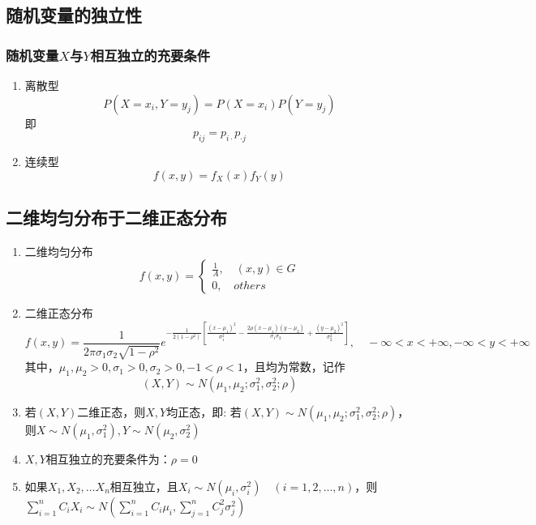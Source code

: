 \subsection{随机变量的独立性}
\subsubsection{随机变量$X$与$Y$相互独立的充要条件}
\begin{enumerate}
	\item 离散型
	\begin{equation}
		P(X=x_i, Y=y_j) = P(X=x_i)P(Y=y_j)
	\end{equation}
	即
	\begin{equation}
		p_{ij} = p_{i\cdot} p_{\cdot j}
	\end{equation}

	\item 连续型
	\begin{equation}
		f(x, y) = f_X(x)f_Y(y)
	\end{equation}
	
\end{enumerate}


\subsection{二维均匀分布于二维正态分布}
\begin{enumerate}
	\item 二维均匀分布
		\[ f(x, y)=\begin{cases}
			\frac{1}{A}, \quad (x, y) \in G \\
			0, \quad others
		\end{cases} \]

	\item 二维正态分布
	\begin{equation}
		f(x,y) = \frac{1}{2\pi \sigma_1 \sigma_2 \sqrt{1-\rho^2}}e^{-\frac{1}{2(1-\rho^2)}\left[ \frac{(x-\mu_1)^2}{\sigma_1^2} - \frac{2\rho(x-\mu_1)(y-\mu_2)}{\sigma_1 \sigma_2} + \frac{(y-\mu_2)^2}{\sigma_2^2} \right]}, \quad -\infty<x<+\infty, -\infty<y<+\infty
	\end{equation}
	其中，$\mu_1, \mu_2 > 0, \sigma_1>0, \sigma_2 > 0, -1<\rho < 1$，且均为常数，记作
	\begin{equation}
		(X,Y) \sim N(\mu_1, \mu_2; \sigma_1^2, \sigma_2^2; \rho)
	\end{equation}

	\item 若$(X,Y)$二维正态，则$X, Y$均正态，即: 若$(X, Y) \sim N(\mu_1, \mu_2; \sigma_1^2, \sigma_2^2; \rho)$，则$X \sim N(\mu_1, \sigma_1^2), Y \sim N(\mu_2, \sigma_2^2)$
	
	\item $X, Y$相互独立的充要条件为：$\rho = 0$

	\item 如果$X_1, X_2, \dots X_n$相互独立，且$X_i \sim N(\mu_i, \sigma_i^2) \quad (i = 1, 2, \dots, n)$，则$\sum_{i=1}^{n}C_iX_i \sim N(\sum_{i=1}^{n}C_i\mu_i, \sum_{j=1}^{n}C_j^2\sigma_j^2)$
\end{enumerate}



